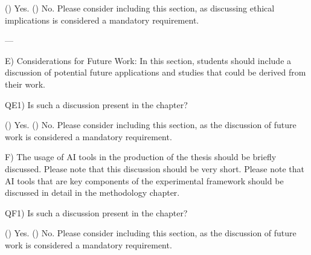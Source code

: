 () Yes.  
() No. Please consider including this section, as discussing ethical implications is considered a mandatory requirement.

---

E) Considerations for Future Work: In this section, students should include a discussion of potential future applications and studies that could be derived from their work.

QE1) Is such a discussion present in the chapter?

() Yes.  
() No. Please consider including this section, as the discussion of future work is considered a mandatory requirement.

F) The usage of AI tools in the production of the thesis should be briefly discussed. Please note that this discussion should be very short. Please note that AI tools that are key components of the experimental framework should be discussed in detail in the methodology chapter. 

QF1) Is such a discussion present in the chapter?

() Yes.  
() No. Please consider including this section, as the discussion of future work is considered a mandatory requirement.

